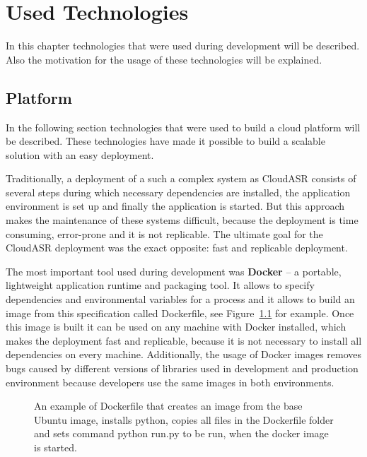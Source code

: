 \chapter{Used Technologies}\label{sec:technologies}
In this chapter technologies that were used during development will be described.
Also the motivation for the usage of these technologies will be explained.

\section{Platform}
In the following section technologies that were used to build a cloud platform will be described.
These technologies have made it possible to build a scalable solution with an easy deployment.

Traditionally, a deployment of a such a complex system as CloudASR consists of several steps
  during which necessary dependencies are installed,
  the application environment is set up
  and finally the application is started.
But this approach makes the maintenance of these systems difficult,
  because the deployment is time consuming, error-prone and it is not replicable.
The ultimate goal for the CloudASR deployment was the exact opposite: fast and replicable deployment.

The most important tool used during development was \textbf{Docker} \cite{merkel2014docker}
  -- a portable, lightweight application runtime and packaging tool.
It allows to specify dependencies and environmental variables for a process
  and it allows to build an image from this specification called Dockerfile,
  see Figure~\ref{fig:dockerfile} for example.
Once this image is built it can be used on any machine with Docker installed,
  which makes the deployment fast and replicable,
  because it is not necessary to install all dependencies on every machine.
Additionally, the usage of Docker images removes bugs caused by different versions of libraries used in development and production environment
  because developers use the same images in both environments.

\begin{figure}[h]
  

  \caption{
    An example of Dockerfile that creates an image from the base Ubuntu image,
      installs python,
      copies all files in the Dockerfile folder
      and sets command python run.py to be run,
        when the docker image is started.
  }
  \label{fig:dockerfile}
\end{figure}


